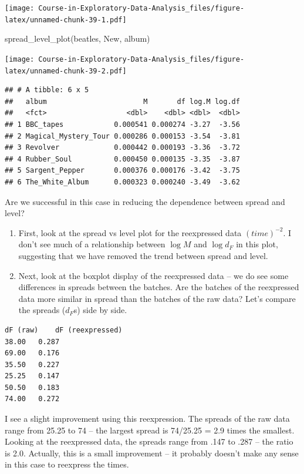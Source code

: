 \documentclass[
]{book}
\newenvironment{Shaded}{\begin{snugshade}}{\end{snugshade}}
\newcommand{\FunctionTok}[1]{\textcolor[rgb]{0.00,0.00,0.00}{#1}}
\newcommand{\NormalTok}[1]{#1}
\begin{document}
\texttt{[image: Course-in-Exploratory-Data-Analysis\_files/figure-latex/unnamed-chunk-39-1.pdf]}

\begin{Shaded}
\begin{Highlighting}[]
\FunctionTok{spread\_level\_plot}\NormalTok{(beatles, New, album)}
\end{Highlighting}
\end{Shaded}

\texttt{[image: Course-in-Exploratory-Data-Analysis\_files/figure-latex/unnamed-chunk-39-2.pdf]}

\begin{verbatim}
## # A tibble: 6 x 5
##   album                       M       df log.M log.df
##   <fct>                   <dbl>    <dbl> <dbl>  <dbl>
## 1 BBC_tapes            0.000541 0.000274 -3.27  -3.56
## 2 Magical_Mystery_Tour 0.000286 0.000153 -3.54  -3.81
## 3 Revolver             0.000442 0.000193 -3.36  -3.72
## 4 Rubber_Soul          0.000450 0.000135 -3.35  -3.87
## 5 Sargent_Pepper       0.000376 0.000176 -3.42  -3.75
## 6 The_White_Album      0.000323 0.000240 -3.49  -3.62
\end{verbatim}

Are we successful in this case in reducing the dependence between spread and level?

\begin{enumerate}
\def\labelenumi{\arabic{enumi}.}
\item
  First, look at the spread vs level plot for the reexpressed data \((time)^{-2}\). I don't see much of a relationship between \(\log M\) and \(\log d_F\) in this plot, suggesting that we have removed the trend between spread and level.
\item
  Next, look at the boxplot display of the reexpressed data -- we do see some differences in spreads between the batches. Are the batches of the reexpressed data more similar in spread than the batches of the raw data? Let's compare the spreads (\(d_F\)s) side by side.
\end{enumerate}

\begin{verbatim}
dF (raw)    dF (reexpressed)
38.00   0.287
69.00   0.176
35.50   0.227
25.25   0.147
50.50   0.183
74.00   0.272
\end{verbatim}

I see a slight improvement using this reexpression. The spreads of the raw data range from 25.25 to 74 -- the largest spread is 74/25.25 = 2.9 times the smallest. Looking at the reexpressed data, the spreads range from .147 to .287 -- the ratio is 2.0. Actually, this is a small improvement -- it probably doesn't make any sense in this case to reexpress the times.
\end{document}
